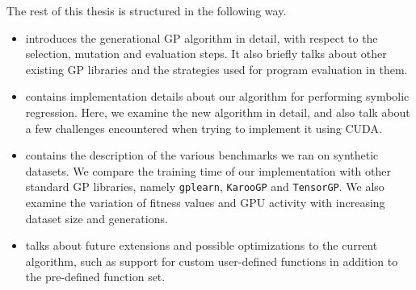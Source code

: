 The rest of this thesis is structured in the following way. 
\begin{itemize}
  \item {} introduces the generational GP algorithm in detail, with respect to the selection, mutation and evaluation steps. It also briefly talks about other existing GP libraries and the strategies used for program evaluation in them. 
  \item {} contains implementation details about our algorithm for performing symbolic regression. Here, we examine the new algorithm in detail, and also talk about a few challenges encountered when trying to implement it using CUDA.
  \item {} contains the description of the various benchmarks we ran on synthetic datasets. We compare the training time of our implementation with other standard GP libraries, namely \texttt{gplearn}\citep{gplearn}, \texttt{KarooGP}\citep{staats2017tensorflow} and \texttt{TensorGP}\citep{baeta2021tensorgp}.
  We also examine the variation of fitness values and GPU activity with increasing dataset size and generations.
  \item {} talks about future extensions and possible optimizations to the current algorithm, such as support for custom user-defined functions in addition to the pre-defined function set.
\end{itemize}
